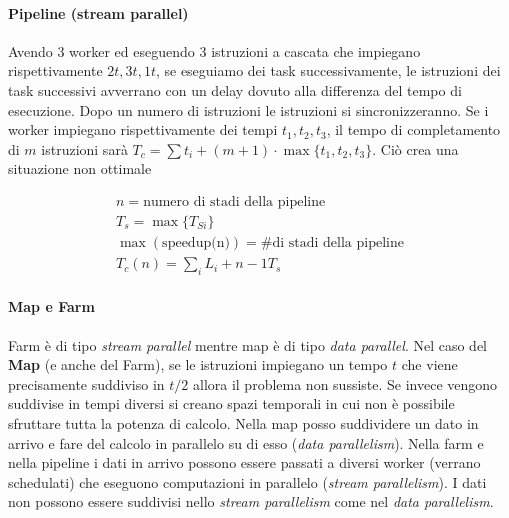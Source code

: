 

\paragraph{Pipeline (stream parallel)}


Avendo 3 worker ed eseguendo 3 istruzioni a cascata che impiegano rispettivamente $ 2t, 3t, 1t $, se eseguiamo dei task successivamente, le istruzioni dei task successivi avverrano con un delay dovuto alla differenza del tempo di esecuzione. Dopo un numero di istruzioni le istruzioni si sincronizzeranno. Se i worker impiegano rispettivamente dei tempi $ t_1,t_2,t_3 $, il tempo di completamento di $ m $ istruzioni sarà $ T_c = \sum t_i + (m + 1) \cdot \max\{t_1,t_2,t_3\} $. Ciò crea una situazione non ottimale

\[ \begin{aligned}
n = \text{numero di stadi della pipeline} \\
T_s = \max\{T_{Si}\} \\
\max(\text{speedup(n)}) = \text{\# di stadi della pipeline} \\
T_c (n) = \sum_i L_i + n-1 T_s
\end{aligned} \]


\paragraph{Map e Farm}

Farm è di tipo \textit{stream parallel} mentre map è di tipo \textit{data parallel}. Nel caso del \textbf{Map} (e anche del Farm), se le  istruzioni impiegano un tempo $ t $ che viene precisamente suddiviso in $ t/2 $ allora il problema non sussiste. Se invece vengono suddivise in tempi diversi si creano spazi temporali in cui non è possibile sfruttare tutta la potenza di calcolo. Nella map posso suddividere un dato in arrivo e fare del calcolo in parallelo su di esso (\textit{data parallelism}). Nella farm e nella pipeline i dati in arrivo possono essere passati a diversi worker (verrano schedulati) che eseguono computazioni in parallelo (\textit{stream parallelism}). I dati non possono essere suddivisi nello \textit{stream parallelism} come nel \textit{data parallelism}.


